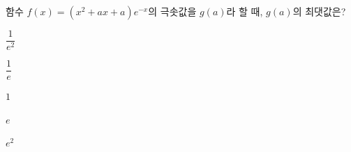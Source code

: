 함수 $f(x)=(x^2+ax+a)e^{-x}$의 극솟값을 $g(a)$라 할 때, $g(a)$의 최댓값은? 
\begin{choices32}{\rule[-3ex]{0pt}{8ex}$\dfrac{1}{e^2}$}{\rule[-3ex]{0pt}{8ex}$\dfrac{1}{e}$}{\rule[-3ex]{0pt}{8ex}$1$}{\rule[-3ex]{0pt}{8ex}$e$}{\rule[-3ex]{0pt}{8ex}$e^2$}\end{choices32}
